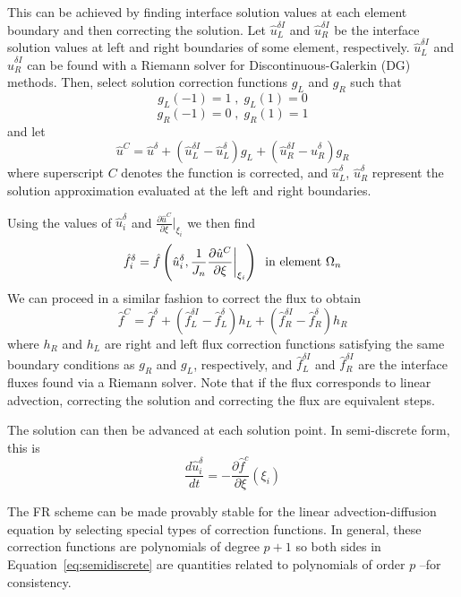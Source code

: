 This can be achieved by finding interface solution values at each element boundary and then correcting the 
solution. Let $\hat{u}_L^{\delta I}$ and $\hat{u}_R^{\delta I}$ be the interface solution values at left and right 
boundaries of some element, respectively. $\hat{u}_L^{\delta I}$ and $\hat{u}_R^{\delta I}$ can be found with a Riemann solver for Discontinuous-Galerkin (DG) methods\cite{hesthaven2007}. Then, select solution correction functions $g_L$ and 
$g_R$ such 
that
\begin{equation}\label{eq:condition}
g_L(-1) = 1 \;,\; g_L(1) = 0
\end{equation}
\begin{equation}
g_R(-1) = 0 \;,\; g_R(1) = 1
\end{equation}
and let
\begin{equation}
\hat{u}^C = \hat{u}^\delta + (\hat{u}^{\delta I}_L - \hat{u}^\delta_L) g_L + (\hat{u}^{\delta I}_R 
- \hat{u}^\delta_R) g_R
\end{equation}
where superscript $C$ denotes the function is corrected, and $\hat{u}^\delta_L$, $\hat{u}^\delta_R$ 
represent the solution approximation evaluated at the left and right boundaries.

Using the values of $\hat{u}^\delta_i$ and $\frac{\partial \hat{u}^C}{\partial \xi}|_{\xi_i}$ we then find 
$$\hat{f}_i^\delta = \hat{f}\left(\hat{u}^\delta_i,\frac{1}{J_n}\frac{\partial \hat{u}^C}{\partial \xi}\bigg|_{\xi_i}\right) \;\; \text{in element } \Omega_n$$
We can proceed in a similar fashion to correct the flux to obtain
\begin{equation}
\hat{f}^C = \hat{f}^\delta + (\hat{f}^{\delta I}_L - \hat{f}^\delta_L) h_L + (\hat{f}^{\delta I}_R 
- \hat{f}^\delta_R) h_R
\end{equation}
where $h_R$ and $h_L$ are right and left flux correction functions satisfying the same boundary 
conditions as $g_R$ and $g_L$, respectively, and $\hat{f}_L^{\delta I}$ and $\hat{f}_R^{\delta I}$ are the interface fluxes found via a Riemann solver. Note that if the flux corresponds to linear advection, correcting the solution and correcting the flux are equivalent steps.

The solution can then be advanced at each solution point. In semi-discrete form, this is
\begin{equation}\label{eq:semidiscrete}
\frac{d \hat{u}_i^\delta}{d t} = - \frac{\partial \hat{f}^c}{\partial \xi}(\xi_i)
\end{equation}

The FR scheme can be made provably stable for the linear advection-diffusion equation by selecting special types of correction functions\cite{castonguay2013}. In general, these correction functions are polynomials of degree $p+1$ so both sides in Equation~\eqref{eq:semidiscrete} are quantities related to polynomials of order $p$ --for consistency\cite{huynh2007}.


